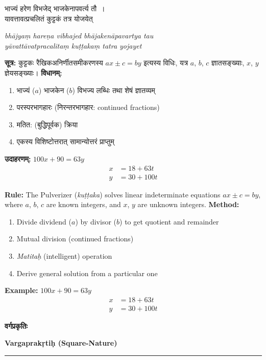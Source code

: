 \documentclass[11pt,a4paper]{article}
\newcommand{\dev}[1]{{\devanagarifont #1}}
\newcommand{\bicol}[2]{%
\noindent%
\begin{minipage}[t]{0.48\textwidth}
\begin{flushleft}
\small
#1
\end{flushleft}
\end{minipage}%
\hfill%
\begin{minipage}[t]{0.48\textwidth}
\begin{flushleft}
\small
#2
\end{flushleft}
\end{minipage}%
\vspace{0.4em}
}
\newcommand{\bicolverse}[2]{%
\par\noindent%
\begin{minipage}[t]{0.48\textwidth}
\centering
\color{versecolor}
\devanagarifont
\small
#1
\end{minipage}%
\hfill%
\begin{minipage}[t]{0.48\textwidth}
\centering
\color{versecolor}
\small
#2
\end{minipage}%
\par\vspace{0.4em}
}
\newcommand{\sectionbicol}[2]{%
\vspace{0.5em}
\noindent%
\begin{minipage}[t]{0.48\textwidth}
\begin{center}
\large\bfseries\color{sectioncolor}
\dev{#1}
\end{center}
\end{minipage}%
\hfill%
\begin{minipage}[t]{0.48\textwidth}
\begin{center}
\large\bfseries\color{sectioncolor}
#2
\end{center}
\end{minipage}%
\vspace{0.3em}
\noindent\rule{\textwidth}{0.4pt}
}
\begin{document}
\bicolverse{%
भाज्यं हरेण विभजेद् भाजकेनापवर्त्य तौ~।\\
यावत्तावत्प्रचलितं कुट्टकं तत्र योजयेत्~
}{%
\textit{bh\={a}jya\d{m} hare\d{n}a vibhajed bh\={a}jaken\={a}pavartya tau}\\
\textit{y\={a}vatt\={a}vatpracalita\d{m} ku\d{t}\d{t}aka\d{m} tatra yojayet}
}

\vspace{0.5cm}

\bicol{%
\textbf{सूत्र:} कुट्टकः रैखिकअनिर्णीतसमीकरणस्य $ax \pm c = by$ इत्यस्य विधिः, यत्र $a$, $b$, $c$ ज्ञातसङ्ख्याः, $x$, $y$ ज्ञेयसङ्ख्याः।
\vspace{0.3cm}
\textbf{विधानम्:}
\begin{enumerate}[leftmargin=1.5em,topsep=0pt]
\item भाज्यं ($a$) भाजकेन ($b$) विभज्य लब्धिः तथा शेषं ज्ञातव्यम्
\item परस्परभागहारः (निरन्तरभागहार: continued fractions)
\item \dev{मतित:} (बुद्धिपूर्वक) क्रिया
\item एकस्य विशिष्टोत्तरात् सामान्योत्तरं प्राप्तुम्
\end{enumerate}
\textbf{उदाहरणम्:} $100x + 90 = 63y$
\begin{align*}
x &= 18 + 63t \\
y &= 30 + 100t
\end{align*}
}{%
\textbf{Rule:} The Pulverizer (\textit{ku\d{t}\d{t}aka}) solves linear indeterminate equations $ax \pm c = by$, where $a$, $b$, $c$ are known integers, and $x$, $y$ are unknown integers.
\vspace{0.3cm}
\textbf{Method:}
\begin{enumerate}[leftmargin=1.5em,topsep=0pt]
\item Divide dividend ($a$) by divisor ($b$) to get quotient and remainder
\item Mutual division (continued fractions)
\item \textit{Matita\d{h}} (intelligent) operation
\item Derive general solution from a particular one
\end{enumerate}
\textbf{Example:} $100x + 90 = 63y$
\begin{align*}
x &= 18 + 63t \\
y &= 30 + 100t
\end{align*}
}

\clearpage

\sectionbicol{वर्गप्रकृतिः}{Vargaprak\d{r}ti\d{h} (Square-Nature)}
\end{document}
